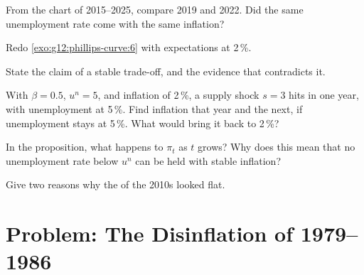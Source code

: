 \begin{exercise}[$\star\star$]\label{exo:g12:phillips-curve:10}
From the chart of 2015--2025, compare 2019 and 2022. Did the same unemployment rate come with the same inflation?
\end{exercise}

\begin{exercise}[$\star\star$]\label{exo:g12:phillips-curve:11}
Redo \cref{exo:g12:phillips-curve:6} with expectations  at 2\,\%.
\end{exercise}

\begin{exercise}[$\star\star\star$]\label{exo:g12:phillips-curve:12}
State the claim of a stable trade-off, and the evidence that contradicts it.
\end{exercise}

\begin{exercise}[$\star\star\star$]\label{exo:g12:phillips-curve:13}
With $\beta = 0.5$, $u^n = 5$,  and inflation of 2\,\%, a supply shock $s = 3$ hits in one year, with unemployment at 5\,\%. Find inflation that year and
the next, if unemployment stays at 5\,\%. What would bring it back to 2\,\%?
\end{exercise}

\begin{exercise}[$\star\star\star$]\label{exo:g12:phillips-curve:14}
In the proposition, what happens to $\pi_t$ as $t$ grows? Why does this mean that no unemployment rate below $u^n$ can be held with stable inflation?
\end{exercise}

\begin{exercise}[$\star\star\star$]\label{exo:g12:phillips-curve:15}
Give two reasons why the  of the 2010s looked flat.
\end{exercise}

\section{Problem: The Disinflation of 1979--1986}

